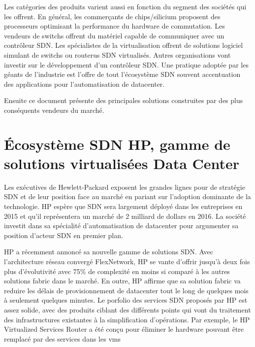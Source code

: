 Les catégories des produits varient aussi en fonction du segment des sociétés qui les offrent. En général, les commerçants de chips/silicium proposent des processeurs optimisant la performance du hardware de commutation.  Les vendeurs de switchs offrent du matériel capable de communiquer avec un contrôleur SDN. Les spécialistes de la \gls{virtualisation} offrent de solutions logiciel simulant de switchs ou routerus SDN virtualisés. Autres organisations vont investir sur le développement d'un contrôleur SDN. Une pratique adoptée par les géants de l'industrie est l'offre de tout l'écosystème SDN souvent accentuation des applications pour l'automatisation de \gls{datacenter}.
 \cite{2013GuideSDNNVEcosystem}
 
 
Ensuite ce document présente des principales solutions construites par des plus conséquents vendeurs du marché.



\section{Écosystème SDN HP, gamme de solutions virtualisées Data Center}


Les exécutives de Hewlett-Packard exposent les grandes lignes pour de stratégie SDN et de leur position face au marché en pariant sur l'adoption dominante de la technologie. HP espère que SDN sera largement déployé dans les entreprises en 2015 et qu'il représentera un marché de 2 milliard de dollars en 2016. La société investit dans sa spécialité d'automatisation de \gls{datacenter} pour argumenter sa position d'acteur SDN en premier plan. \cite{ExecutiveGuideToSDNHP}


HP a récemment annoncé sa nouvelle gamme de solutions SDN. Avec l'architecture réseau convergé FlexNetwork, HP se vante d'offrir jusqu'à deux fois plus d'évolutivité avec 75\% de complexité en moins si comparé à les autres solutions fabric dans le marché. En outre, HP affirme que sa solution fabric va reduire les délais de provisionnement de \gls{datacenter} tout le long de quelques mois à seulement quelques minutes. Le porfolio des services SDN proposés par HP est assez solide, avec des produits ciblant des différents points qui vont du traitement des infrastructures existantes à la simplification d'opérations. Par exemple, le HP Virtualized Services Router a été conçu pour éliminer le hardware pouvant être remplacé par des services dans les \glspl{vm}  \cite{ExecutiveGuideToSDNHPFabric}

